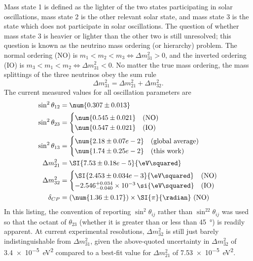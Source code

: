 Mass state 1 is defined as the lighter of the two states
participating in solar oscillations,
mass state 2 is the other relevant solar state,
and mass state 3 is the state which does not participate in solar oscillations.
The question of whether mass state 3 is heavier or lighter than the other two
is still unresolved;
this question is known as the neutrino mass ordering (or hierarchy) problem.
The normal ordering (NO) is $m_1 < m_2 < m_3 \Leftrightarrow \Delta m^2_{31} > 0$,
and the inverted ordering (IO) is
$m_3 < m_1 < m_2 \Leftrightarrow \Delta m^2_{31} < 0$.
No matter the true mass ordering,
the mass splittings of the three neutrinos obey the sum rule
\begin{equation}\label{eq:sum_rule}
    \Delta m^2_{31} = \Delta m^2_{21} + \Delta m^2_{32}.
\end{equation}
The current measured values for all oscillation parameters are \cite{pdg}
\begin{align}\label{eq:current_values}
    \begin{split}
        \sin^2\theta_{12} &= \num{0.307\pm0.013} \\
        \sin^2\theta_{23} &=
        \begin{cases}
            \num{0.545\pm0.021} & (\text{NO}) \\
            \num{0.547\pm0.021} & (\text{IO})
        \end{cases} \\
        \sin^2\theta_{13} &=
        \begin{cases}
            \num{2.18\pm0.07e-2} & (\text{global average}) \\
            \num{1.74\pm0.25e-2} & (\text{this work})
        \end{cases} \\
        \Delta m^2_{21} &= \SI{7.53\pm0.18e-5}{\eV\squared} \\
        \Delta m^2_{32} &=
        \begin{cases}
            \SI{2.453\pm0.034e-3}{\eV\squared} & (\text{NO}) \\
            -2.546^{+0.034}_{-0.040}\times 10^{-3}\,\si{\eV\squared} & (\text{IO})
        \end{cases} \\
        \delta_{CP} &= (\num{1.36\pm0.17})\times \SI{\pi}{\radian}\ (\text{NO})
    \end{split}
\end{align}
In this listing, the convention of reporting $\sin^2\theta_{ij}$
rather than $\sin^22\theta_{ij}$ was used
so that the octant of $\theta_{23}$
(whether it is greater than or less than \SI{45}{\degree})
is readily apparent.
At current experimental resolutions,
$\Delta m^2_{32}$ is still just barely indistinguishable from $\Delta m^2_{31}$,
given the above-quoted uncertainty in $\Delta m^2_{32}$ of
\SI{3.4e-5}{\eV\squared} compared to
a best-fit value for $\Delta m^2_{21}$ of \SI{7.53e-5}{\eV\squared}.

